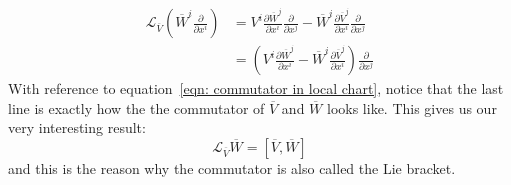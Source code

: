         \begin{align*}
          \mathcal{L}_{\overline{V}}\left(\overline{W}^i\frac{\partial}{\partial
          x^i}\right) 
          &= V^i\frac{\partial \overline{W}^j}{\partial
          x^i}\frac{\partial}{\partial x^j} - \overline{W}^i \frac{\partial
          \overline{V}^j}{\partial x^i}\frac{\partial}{\partial x^j} \\
          &=\left(V^i\frac{\partial \overline{W}^j}{\partial x^i} -
          \overline{W}^i \frac{\partial \overline{V}^j}{\partial x^i}
          \right)\frac{\partial}{\partial x^j}
        \end{align*}
        With reference to equation~\ref{eqn: commutator in local chart},
        notice that the last line is exactly how the the commutator of
        $\overline{V}$ and $\overline{W}$ looks like. This gives us our very
        interesting result:
        \begin{equation}
          \mathcal{L}_{\overline{V}}\overline{W} =
          \left[\overline{V},\overline{W}\right]
        \end{equation}
        and this is the reason why the commutator is also called the Lie
        bracket.
